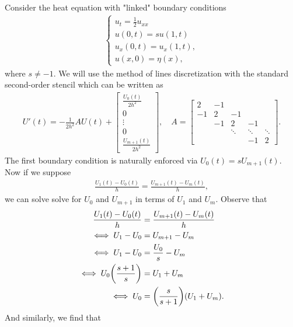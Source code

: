 \documentclass[12pt]{report}
\begin{document}
\begin{solution}

  \noindent
  Consider the heat equation with "linked" boundary conditions
  \begin{align*}
    \begin{cases}
        u_t = \frac 1 2 u_{xx}\\
        u(0,t) = s u(1,t)\\
        u_x(0,t) = u_x(1,t),\\
        u(x,0) = \eta(x),
    \end{cases}
  \end{align*}
  where $s \neq -1$. We will use the method of lines discretization with the standard second-order stencil which can be written as
  \begin{align*}
    U'(t) = -\frac{1}{2h^2} A U(t) + \begin{bmatrix} \frac{U_0(t)}{2h^2} \\ 0 \\ \vdots \\ 0 \\ \frac{U_{m+1}(t)}{2h^2} \end{bmatrix}, \quad 
      A = \begin{bmatrix}
        2  & -1\\
        -1 & 2 & -1 \\
        & -1 & 2 & -1\\
        && \ddots & \ddots & \ddots \\
        &&& -1 & 2 \end{bmatrix}.
  \end{align*}
  The first boundary condition is naturally enforced via $U_0(t) = sU_{m+1}(t)$. Now if we suppose
  \begin{align*}
    \frac{U_{1}(t) - U_0(t)}{h} = \frac{U_{m+1}(t) - U_m(t)}{h},
  \end{align*}
  we can solve solve for $U_0$ and $U_{m+1}$ in terms of $U_1$ and $U_m$. Observe that
  \begin{align*}
    \frac{U_{1}(t) - U_0(t)}{h} &= \frac{U_{m+1}(t) - U_m(t)}{h}\\
    \iff U_1 - U_0 &= U_{m+1} - U_m\\
    \iff U_1 - U_0 &= \frac{U_0}{s} - U_m\\
    \iff  U_0 {\left(\frac{s+1}{s}\right)} &= U_1 + U_m \\
    \iff  U_0 &= {\left(\frac{s}{s+1}\right)}{\left(U_1 + U_m\right)}.
  \end{align*}
  And similarly, we find that 
  \begin{align*}

\end{align*}
\end{solution}
\end{document}
